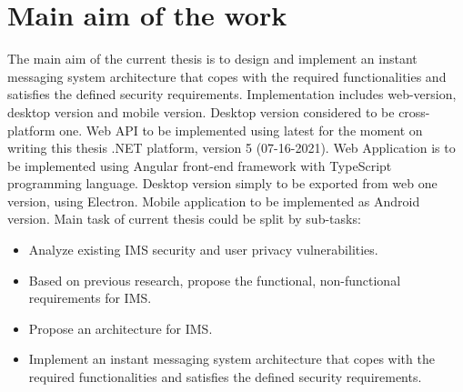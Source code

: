 \chapter{Main aim of the work}\label{ch:main-aim-of-the-work}

The main aim of the current thesis is to design and implement an instant messaging system architecture that copes with the required functionalities and
satisfies the defined security requirements.
Implementation includes web-version, desktop version and mobile version.
Desktop version considered to be cross-platform one.
Web API to be implemented using latest for the moment on writing this thesis .NET platform, version 5 (07-16-2021).
Web Application is to be implemented using Angular front-end framework with TypeScript programming language.
Desktop version simply to be exported from web one version, using Electron.
Mobile application to be implemented as Android version.
Main task of current thesis could be split by sub-tasks:
\begin{itemize}
    \item Analyze existing IMS security and user privacy vulnerabilities.
    \item Based on previous research, propose the functional, non-functional requirements for IMS.
    \item Propose an architecture for IMS.
    \item Implement an instant messaging system architecture that copes with the required functionalities and
    satisfies the defined security requirements.
\end{itemize}